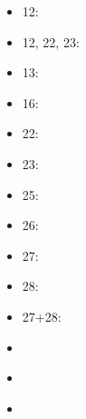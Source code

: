 \documentclass{ifacconf}
\begin{document}
\begin{itemize}
  \item 12: \cite{bi:12}
  \item 12, 22, 23: \cite{bi:12,bi:22,bi:23}
  \item 13: \cite{bi:13}
  \item 16: \cite{bi:16}
  \item 22: \cite{bi:22}
  \item 23: \cite{bi:23}
  \item 25: \cite{bi:25}
  \item 26: \cite{bi:26}
  \item 27: \cite{bi:27}
  \item 28: \cite{bi:28}
  \item 27+28: \cite{bi:27,bi:28}
  \item \cite{bi:salman}
  \item \cite{bi:lib}
  \item \cite{bi:Tavaeva}
\end{itemize}
  
\end{document}
